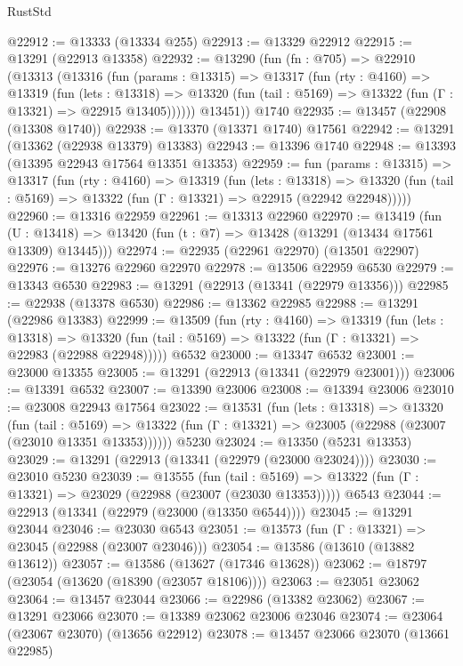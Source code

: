 \begin{lexlean}{RustStd}
\begin{coremodule}
@22912 := @13333 (@13334 @255)
@22913 := @13329 @22912
@22915 := @13291 (@22913 @13358)
@22932 := @13290
    (fun (fn : @705) =>
    @22910
      (@13313
        (@13316
          (fun (params : @13315) =>
          @13317
            (fun (rty : @4160) =>
            @13319
              (fun (lets : @13318) =>
              @13320 (fun (tail : @5169) => @13322 (fun (Γ : @13321) => @22915 @13405))))))
        @13451))
    @1740
@22935 := @13457 (@22908 (@13308 @1740))
@22938 := @13370 (@13371 @1740) @17561
@22942 := @13291 (@13362 (@22938 @13379) @13383)
@22943 := @13396 @1740
@22948 := @13393 (@13395 @22943 @17564 @13351 @13353)
@22959 := fun (params : @13315) =>
  @13317
    (fun (rty : @4160) =>
    @13319
      (fun (lets : @13318) =>
      @13320 (fun (tail : @5169) => @13322 (fun (Γ : @13321) => @22915 (@22942 @22948)))))
@22960 := @13316 @22959
@22961 := @13313 @22960
@22970 := @13419
    (fun (U : @13418) => @13420 (fun (t : @7) => @13428 (@13291 (@13434 @17561 @13309) @13445)))
@22974 := @22935 (@22961 @22970) (@13501 @22907)
@22976 := @13276 @22960 @22970
@22978 := @13506 @22959 @6530
@22979 := @13343 @6530
@22983 := @13291 (@22913 (@13341 (@22979 @13356)))
@22985 := @22938 (@13378 @6530)
@22986 := @13362 @22985
@22988 := @13291 (@22986 @13383)
@22999 := @13509
    (fun (rty : @4160) =>
    @13319
      (fun (lets : @13318) =>
      @13320 (fun (tail : @5169) => @13322 (fun (Γ : @13321) => @22983 (@22988 @22948)))))
    @6532
@23000 := @13347 @6532
@23001 := @23000 @13355
@23005 := @13291 (@22913 (@13341 (@22979 @23001)))
@23006 := @13391 @6532
@23007 := @13390 @23006
@23008 := @13394 @23006
@23010 := @23008 @22943 @17564
@23022 := @13531
    (fun (lets : @13318) =>
    @13320
      (fun (tail : @5169) =>
      @13322 (fun (Γ : @13321) => @23005 (@22988 (@23007 (@23010 @13351 @13353))))))
    @5230
@23024 := @13350 (@5231 @13353)
@23029 := @13291 (@22913 (@13341 (@22979 (@23000 @23024))))
@23030 := @23010 @5230
@23039 := @13555
    (fun (tail : @5169) => @13322 (fun (Γ : @13321) => @23029 (@22988 (@23007 (@23030 @13353)))))
    @6543
@23044 := @22913 (@13341 (@22979 (@23000 (@13350 @6544))))
@23045 := @13291 @23044
@23046 := @23030 @6543
@23051 := @13573 (fun (Γ : @13321) => @23045 (@22988 (@23007 @23046)))
@23054 := @13586 (@13610 (@13882 @13612))
@23057 := @13586 (@13627 (@17346 @13628))
@23062 := @18797 (@23054 (@13620 (@18390 (@23057 @18106))))
@23063 := @23051 @23062
@23064 := @13457 @23044
@23066 := @22986 (@13382 @23062)
@23067 := @13291 @23066
@23070 := @13389 @23062 @23006 @23046
@23074 := @23064 (@23067 @23070) (@13656 @22912)
@23078 := @13457 @23066 @23070 (@13661 @22985)

\end{coremodule}
\end{lexlean}
